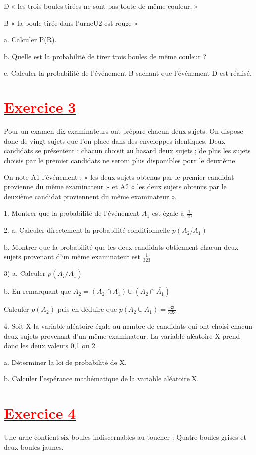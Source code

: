 \documentclass[12pt]{article}
\begin{document}
D « les trois boules tirées ne sont pas toute de même couleur. »

B « la boule tirée dans l’urneU2 est rouge »

      a. Calculer P(R).
      
      b. Quelle est la probabilité de tirer trois boules de même couleur ?
      
      c. Calculer la probabilité de l’événement B sachant que l’événement D est réalisé. 
      
\section*{\underline{\textbf{\textcolor{red}{Exercice 3}}}}
Pour un examen dix examinateurs ont prépare chacun deux sujets. On dispose donc de vingt sujets que l’on place dans des enveloppes identiques. Deux candidats se présentent : chacun choisit au hasard deux sujets ; de plus les sujets choisis par le premier candidats ne seront plus disponibles pour le deuxième.

On note A1 l’événement : «  les deux sujets obtenus par le premier candidat provienne du même examinateur » et A2 « les deux sujets obtenus par le deuxième candidat proviennent du même examinateur ».   

1. Montrer que la probabilité de l’événement $A_{1}$ est égale à $\frac{1}{19}$

2. a. Calculer directement la probabilité conditionnelle $p(A_{2}/A_{1})$

  b. Montrer que la probabilité que les deux candidats obtiennent chacun deux sujets provenant d’un même examinateur est $\frac{1}{323}$
  
3) a. Calculer $p(A_{2}/\overline{A_{1}})$

b. En remarquant que $A_{2}=(A_{2}\cap A_{1})\cup(A_{2}\cap \overline{A_{1}})$

Calculer $p(A_{2})$ puis en déduire que $p(A_{2}\cup A_{1})=\frac{33}{323}$

4. Soit X la variable aléatoire égale au nombre de candidats qui ont choisi chacun deux sujets provenant d’un même examinateur. La variable aléatoire X prend donc les deux valeurs 0,1 ou 2.

      a. Déterminer la loi de probabilité de X.
      
      b. Calculer l’espérance mathématique de la variable aléatoire X.
\section*{\underline{\textbf{\textcolor{red}{Exercice 4}}}}
Une urne contient six boules indiscernables au toucher : Quatre boules grises et deux boules jaunes.
\end{document}
